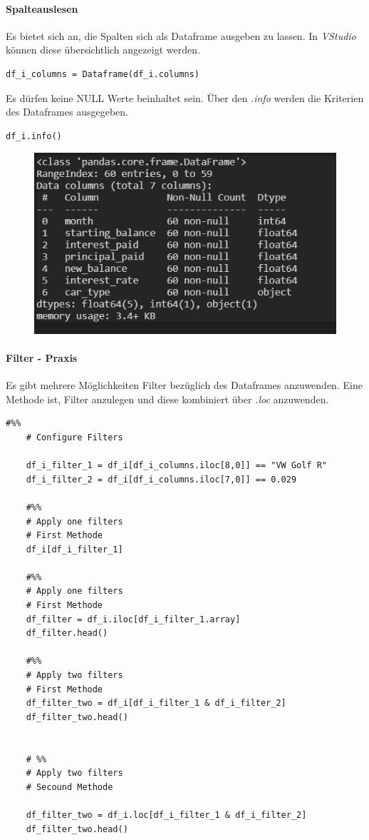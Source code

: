 \paragraph{Spalteauslesen}
Es bietet sich an, die Spalten sich als Dataframe ausgeben zu lassen. In \textit{VStudio} können diese übersichtlich angezeigt werden.
\begin{lstlisting}[style=python]
	df_i_columns = Dataframe(df_i.columns)
\end{lstlisting}
Es dürfen keine NULL Werte beinhaltet sein. Über den \textit{.info} werden die Kriterien des Dataframes ausgegeben.
\begin{lstlisting}[style=Python]
	df_i.info()
\end{lstlisting}
\begin{figure}[H]
	\centering
	\includegraphics[scale = 0.8]{attachment/chapter_4/Scc003}
\end{figure}

\paragraph{Filter - Praxis}
Es gibt mehrere Möglichkeiten Filter bezüglich des Dataframes anzuwenden.
Eine Methode ist, Filter anzulegen und diese kombiniert über \textit{.loc} anzuwenden.
\begin{lstlisting}[style=Python]
	#%%
	# Configure Filters
	
	df_i_filter_1 = df_i[df_i_columns.iloc[8,0]] == "VW Golf R"
	df_i_filter_2 = df_i[df_i_columns.iloc[7,0]] == 0.029
	
	#%%
	# Apply one filters
	# First Methode
	df_i[df_i_filter_1]
	
	#%%
	# Apply one filters
	# First Methode
	df_filter = df_i.iloc[df_i_filter_1.array]
	df_filter.head()
	
	#%%
	# Apply two filters
	# First Methode
	df_filter_two = df_i[df_i_filter_1 & df_i_filter_2]
	df_filter_two.head()
	
	
	# %%
	# Apply two filters
	# Secound Methode
	
	df_filter_two = df_i.loc[df_i_filter_1 & df_i_filter_2]
	df_filter_two.head()
\end{lstlisting}

